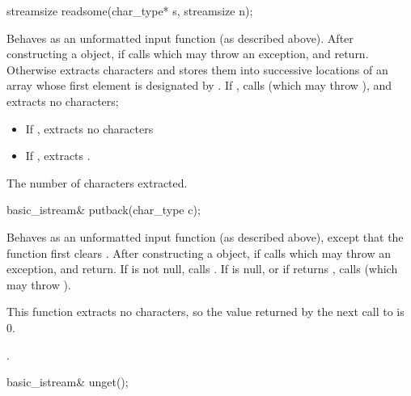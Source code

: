 %
\begin{itemdecl}
streamsize readsome(char_type* s, streamsize n);
\end{itemdecl}

\begin{itemdescr}
\pnum
\effects
Behaves as an unformatted input function (as described above).
After constructing
a  object, if
calls
which may throw an exception,
and return.
Otherwise extracts characters and stores them
into successive locations of an array whose first element is designated by
.
If
,
calls
(which may throw
),
and extracts no characters;
\begin{itemize}
\item
If
,
extracts no characters
\item
If
,
extracts
.
\end{itemize}

\pnum
\returns
The number of characters extracted.
\end{itemdescr}

%
\begin{itemdecl}
basic_istream& putback(char_type c);
\end{itemdecl}

\begin{itemdescr}
\pnum
\effects
Behaves as an unformatted input function (as described above), except that the function first clears .
After constructing
a  object, if
calls
which may throw an exception,
and return.
If
is not null, calls
.
If
is null, or if
returns
,
calls
(which may throw
).
\begin{note}
This
function extracts no characters, so the value returned by the next call to
is 0.
\end{note}

\pnum
\returns
{}.
\end{itemdescr}

%
\begin{itemdecl}
basic_istream& unget();
\end{itemdecl}

